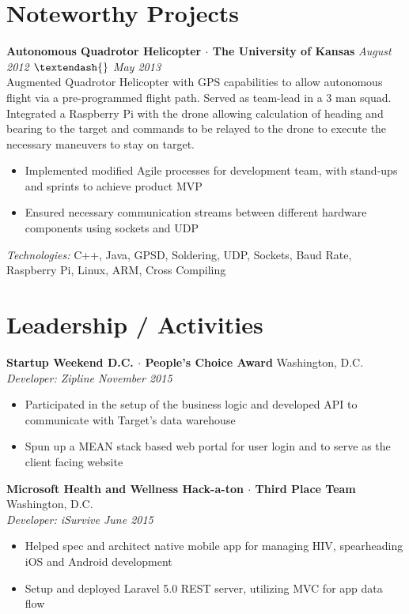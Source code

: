 \documentclass[10pt]{article}
\begin{document}
\section*{Noteworthy Projects}
\textbf{Autonomous Quadrotor Helicopter $\cdot$ The University of Kansas} \hfill \textit{August 2012  $\textendash{}$ May 2013} \\
Augmented Quadrotor Helicopter with GPS capabilities to allow autonomous flight via a pre-programmed flight path. Served as team-lead in a 3 man squad. Integrated a Raspberry Pi with the drone allowing calculation of heading and bearing to the target and commands to be relayed to the drone to execute the necessary maneuvers to stay on target.
\begin{itemize}
  \item Implemented modified Agile processes for development team, with stand-ups and sprints to achieve product MVP
  \item Ensured necessary communication streams between different hardware components using sockets and UDP
\end{itemize}
\textit{Technologies:} C++, Java, GPSD, Soldering, UDP, Sockets, Baud Rate, Raspberry Pi, Linux, ARM, Cross Compiling

\section*{Leadership / Activities}
\textbf{Startup Weekend D.C. $\cdot$ People's Choice Award} \hfill Washington, D.C. \\
\textit{Developer: Zipline \hfill November 2015} \\
\vspace{-1em}
\begin{itemize}
  \item Participated in the setup of the business logic and developed API to communicate with Target's data warehouse
  \item Spun up a MEAN stack based web portal for user login and to serve as the client facing website
\end{itemize}
\textbf{Microsoft Health and Wellness Hack-a-ton $\cdot$ Third Place Team} \hfill Washington, D.C. \\
\textit{Developer: iSurvive \hfill June 2015} \\
\vspace{-1em}
\begin{itemize}
  \item Helped spec and architect native mobile app for managing HIV, spearheading iOS and Android development
  \item Setup and deployed Laravel 5.0 REST server, utilizing MVC for app data flow
\end{itemize}
\end{document}
